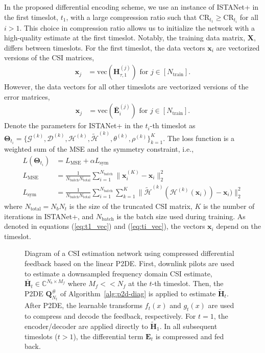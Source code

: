 In the proposed differential encoding scheme, we use an instance of ISTANet+ in the first timeslot, $t_1$, with a large compression ratio such that $\text{CR}_{t_1} \geq \text{CR}_{t_i}$ for all $i > 1$. This choice in compression ratio allows us to initialize the network with a high-quality estimate at the first timeslot. Notably, the training data matrix, $\mathbf X$, differs between timeslots. For the first timeslot, the data vectors $\mathbf{x}_i$ are vectorized versions of the CSI matrices,
\begin{align}
    \mathbf{x}_j &= \text{vec}\left(\mathbf{H}^{(j)}_{\tau,1}\right) \text{ for } j\in[N_{\text{train}}]. 
    \label{eq:t1_vec}
\end{align}
However, the data vectors for all other timeslots are vectorized versions of the error matrices,
\begin{align}
    \mathbf{x}_j &= \text{vec}\left(\bar{\mathbf{E}}^{(j)}_{i}\right) \text{ for } j\in[N_{\text{train}}]. 
    \label{eq:ti_vec}
\end{align}
Denote the parameters for ISTANet+ in the $t_i$-th timeslot as $\mathbf{\Theta}_{t_i}=\{\mathcal G^{(k)}, \mathcal D^{(k)},  \mathcal H^{(k)}, \tilde{\mathcal H}^{(k)}, \theta^{(k)}, \rho^{(k)}\}_{k=1}^{K}$. The loss function is a weighted sum of the MSE and the symmetry constraint, i.e.,
\begin{align}
    L(\mathbf{\Theta}_{t_i}) &= L_{\text{MSE}} + \alpha L_{\text{sym}} \\
    L_{\text{MSE}} &= \frac{1}{N_{\text{batch}}N_{\text{total}}}\sum_{i=1}^{N_{\text{batch}}}\|\mathbf{x}_i^{(K)}-\mathbf{x}_i\|_2^2 \\
    L_{\text{sym}} &= \frac{1}{N_{\text{batch}}N_{\text{total}}}\sum_{i=1}^{N_{\text{batch}}}\sum_{k=1}^{K} \|\tilde{\mathcal{H}}^{(k)}(\mathcal{H}^{(k)}(\mathbf{x}_i)) - \mathbf{x}_i)\|_2^2
\end{align}
where $N_{\text{total}}=N_bN_t$ is the size of the truncated CSI matrix, $K$ is the number of iterations in ISTANet+, and $N_{\text{batch}}$ is the batch size used during training. As denoted in equations (\ref{eq:t1_vec}) and (\ref{eq:ti_vec}), the vectors $\mathbf{x}_i$ depend on the timeslot.

\begin{figure}[!hbtp]
    \centering
    {
      \fontsize{8pt}{8pt}
      \def\svgwidth{1.0\linewidth}
      
    }
    \caption{Diagram of a CSI estimation network using compressed differential feedback based on the linear P2DE. First, downlink pilots are used to estimate a downsampled frequency domain CSI estimate, $\bar{\mathbf{H}}_t\in\mathbb{C}^{N_b \times M_f}$ where $M_f << N_f$ at the $t$-th timeslot. Then, the P2DE $\mathbf{Q}^\#_{N_t}$ of Algorithm~\ref{alg:p2d-diag} is applied to estimate $\tilde{\mathbf{H}}_t$. After P2DE, the learnable transforms $f_t(x)$ and $g_t(x)$ are used to compress and decode the feedback, respectively. For $t=1$, the encoder/decoder are applied directly to $\tilde{\mathbf{H}}_1$. In all subsequent timeslots ($t > 1$), the differential term $\mathbf{E}_t$ is compressed and fed back.}
    \label{fig:markov-p2d}
\end{figure}

